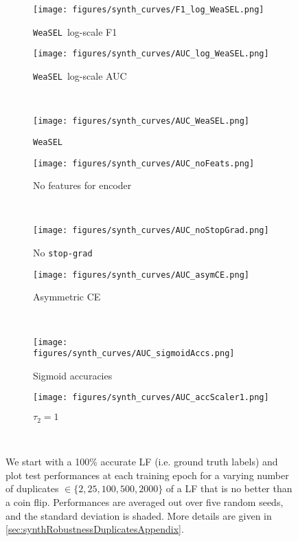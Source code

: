 \documentclass{article}
\newcommand{\weasel}{\texttt{WeaSEL}}\newcommand{\brackets}[1]{\left( #1 \right)}
\begin{document}
\begin{figure}[htb]
\centering
 \begin{subfigure}[b]{.48\linewidth}
    \centering
    \texttt{[image: figures/synth\_curves/F1\_log\_WeaSEL.png]}
    \caption{\weasel\ log-scale F1}\label{fig:logWeaselF1}
    \end{subfigure}\begin{subfigure}[b]{.48\linewidth}
    \centering
    \texttt{[image: figures/synth\_curves/AUC\_log\_WeaSEL.png]}
    \caption{\weasel\ log-scale AUC}\label{fig:logWeaselAUC}
 \end{subfigure} \\
  \begin{subfigure}[b]{.48\linewidth}
    \centering
    \texttt{[image: figures/synth\_curves/AUC\_WeaSEL.png]}
    \caption{\weasel}\label{fig:WeaselAUC}
  \end{subfigure}\begin{subfigure}[b]{.48\linewidth}
    \centering
    \texttt{[image: figures/synth\_curves/AUC\_noFeats.png]}
    \caption{No features for encoder}\label{fig:noFeats}
 \end{subfigure} \\
  \begin{subfigure}[b]{.48\linewidth}
    \centering
    \texttt{[image: figures/synth\_curves/AUC\_noStopGrad.png]}
    \caption{No \texttt{stop-grad}}\label{fig:noStopGrad}
  \end{subfigure}\begin{subfigure}[b]{.48\linewidth}
    \centering
    \texttt{[image: figures/synth\_curves/AUC\_asymCE.png]}
    \caption{Asymmetric CE}\label{fig:asymCE}
 \end{subfigure} \\
  \begin{subfigure}[b]{.48\linewidth}
    \centering
    \texttt{[image: figures/synth\_curves/AUC\_sigmoidAccs.png]}
    \caption{Sigmoid accuracies}\label{fig:SigmoidAccs}
  \end{subfigure}\begin{subfigure}[b]{.48\linewidth}
    \centering
    \texttt{[image: figures/synth\_curves/AUC\_accScaler1.png]}
    \caption{$\tau_2 = 1$}\label{fig:noScaler}
 \end{subfigure} \\
  \caption{We start with a 100\% accurate LF (i.e. ground truth labels) and plot test performances at each training epoch for a varying number of duplicates $\in \{2, 25, 100, 500, 2000\}$ of a LF that is no better than a coin flip. Performances are averaged out over five random seeds, and the standard deviation is shaded. More details are given in \ref{sec:synthRobustnessDuplicatesAppendix}.}
  \label{fig:syntheticRobustnessAppendix}
\end{figure} 



 
\end{document}
